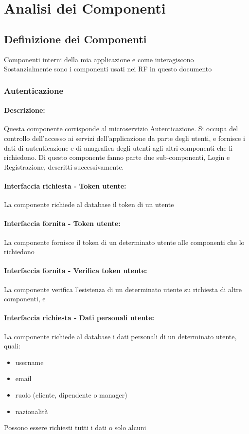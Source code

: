 \documentclass{report}
\begin{document}
\chapter{Analisi dei Componenti}

\section{Definizione dei Componenti}

Componenti interni della mia applicazione e come interagiscono\\
Sostanzialmente sono i componenti usati nei RF in questo documento

\subsection*{Autenticazione}
\subsubsection{Descrizione: } Questa componente corrisponde al microservizio Autenticazione. Si occupa del controllo dell'accesso ai servizi dell'applicazione da parte degli utenti,
e fornisce i dati di autenticazione e di anagrafica degli utenti agli altri componenti che li richiedono.
Di questo componente fanno parte due sub-componenti, Login e Registrazione, descritti successivamente.
\subsubsection{Interfaccia richiesta - Token utente: }La componente richiede al database il token di un utente
\subsubsection{Interfaccia fornita - Token utente: }La componente fornisce il token di un determinato utente alle componenti che lo richiedono
\subsubsection{Interfaccia fornita - Verifica token utente: }La componente verifica l'esistenza di un determinato utente su richiesta di altre componenti, e 
\subsubsection{Interfaccia richiesta - Dati personali utente: } La componente richiede al database i dati personali di un determinato utente, quali:
\begin{itemize}
	\item username
	\item email
	\item ruolo (cliente, dipendente o manager)
	\item nazionalità
\end{itemize}  
Possono essere richiesti tutti i dati o solo alcuni
\end{document}
